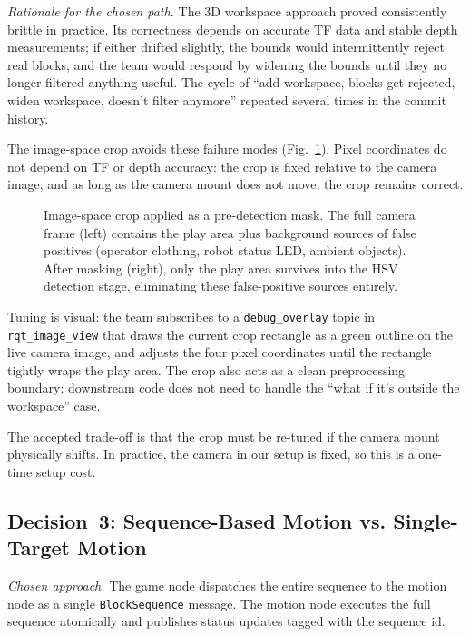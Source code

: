\documentclass[conference]{IEEEtran}
\begin{document}
\textit{Rationale for the chosen path.} The 3D workspace approach
proved consistently brittle in practice. Its correctness depends on
accurate TF data and stable depth measurements; if either drifted
slightly, the bounds would intermittently reject real blocks, and the
team would respond by widening the bounds until they no longer filtered
anything useful. The cycle of ``add workspace, blocks get rejected,
widen workspace, doesn't filter anymore'' repeated several times in
the commit history.

The image-space crop avoids these failure modes (Fig.~\ref{fig:crop}).
Pixel coordinates do not depend on TF or depth accuracy: the crop is
fixed relative to the camera image, and as long as the camera mount
does not move, the crop remains correct.

\begin{figure}[t]
\centering
\fbox{\rule{0pt}{4cm}\rule{0.85\columnwidth}{0pt}}
\caption{Image-space crop applied as a pre-detection mask. The full
camera frame (left) contains the play area plus background sources
of false positives (operator clothing, robot status LED, ambient
objects). After masking (right), only the play area survives into the
HSV detection stage, eliminating these false-positive sources entirely.}
\label{fig:crop}
\end{figure} Tuning is visual: the team subscribes to a
\texttt{debug\_overlay} topic in \texttt{rqt\_image\_view} that draws
the current crop rectangle as a green outline on the live camera
image, and adjusts the four pixel coordinates until the rectangle
tightly wraps the play area. The crop also acts as a clean
preprocessing boundary: downstream code does not need to handle the
``what if it's outside the workspace'' case.

The accepted trade-off is that the crop must be re-tuned if the
camera mount physically shifts. In practice, the camera in our setup
is fixed, so this is a one-time setup cost.

\subsection{Decision~3: Sequence-Based Motion vs. Single-Target Motion}

\textit{Chosen approach.} The game node dispatches the entire
sequence to the motion node as a single \texttt{BlockSequence} message.
The motion node executes the full sequence atomically and publishes
status updates tagged with the sequence id.
\end{document}
